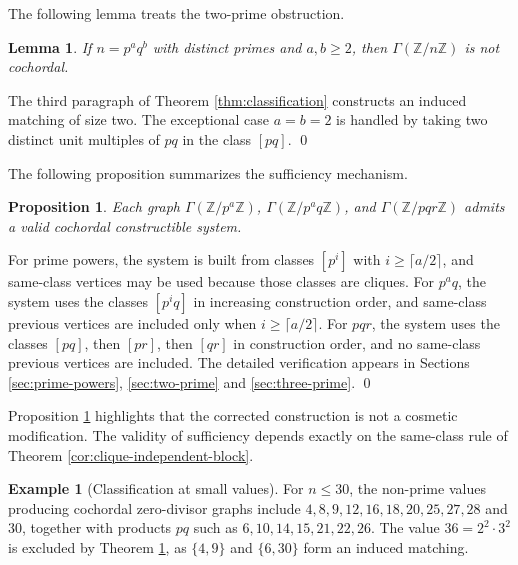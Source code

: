 \documentclass[12pt]{article}
\newtheorem{lemma}[theorem]{Lemma}
\newtheorem{proposition}[theorem]{Proposition}
\theoremstyle{definition}
\newtheorem{example}[theorem]{Example}
\renewenvironment{proof}{{\bf \noindent Proof.}}{\qed}
\begin{document}
\medskip

\noindent The following lemma treats the two-prime obstruction.
\begin{lemma}\label{lem:two-prime-obstruction}
If $n=p^a q^b$ with distinct primes and $a,b\geq 2$, then $\Gamma(\mathbb{Z}/n\mathbb{Z})$ is not cochordal.
\end{lemma}

\begin{proof}
The third paragraph of Theorem \ref{thm:classification} constructs an induced matching of size two.  The exceptional case $a=b=2$ is handled by taking two distinct unit multiples of $pq$ in the class $[pq]$.
\end{proof}


\medskip

\noindent The following proposition summarizes the sufficiency mechanism.
\begin{proposition}\label{prop:sufficiency-summary}
Each graph $\Gamma(\mathbb{Z}/p^a\mathbb{Z})$, $\Gamma(\mathbb{Z}/p^a q\mathbb{Z})$, and $\Gamma(\mathbb{Z}/pqr\mathbb{Z})$ admits a valid cochordal constructible system.
\end{proposition}

\begin{proof}
For prime powers, the system is built from classes $[p^i]$ with $i\geq\lceil a/2\rceil$, and same-class vertices may be used because those classes are cliques.  For $p^a q$, the system uses the classes $[p^i q]$ in increasing construction order, and same-class previous vertices are included only when $i\geq\lceil a/2\rceil$.  For $pqr$, the system uses the classes $[pq]$, then $[pr]$, then $[qr]$ in construction order, and no same-class previous vertices are included.  The detailed verification appears in Sections \ref{sec:prime-powers}, \ref{sec:two-prime} and \ref{sec:three-prime}.
\end{proof}

\medskip

Proposition \ref{prop:sufficiency-summary} highlights that the corrected construction is not a cosmetic modification.  The validity of sufficiency depends exactly on the same-class rule of Theorem \ref{cor:clique-independent-block}.

\medskip

\begin{example}[Classification at small values]\label{ex:classification-small}
For $n\leq 30$, the non-prime values producing cochordal zero-divisor graphs include $4,8,9,12,16,18,20,25,27,28$ and $30$, together with products $pq$ such as $6,10,14,15,21,22,26$.  The value $36=2^2\cdot 3^2$ is excluded by Theorem \ref{lem:two-prime-obstruction}, as $\{4,9\}$ and $\{6,30\}$ form an induced matching.
\end{example}
\end{document}
